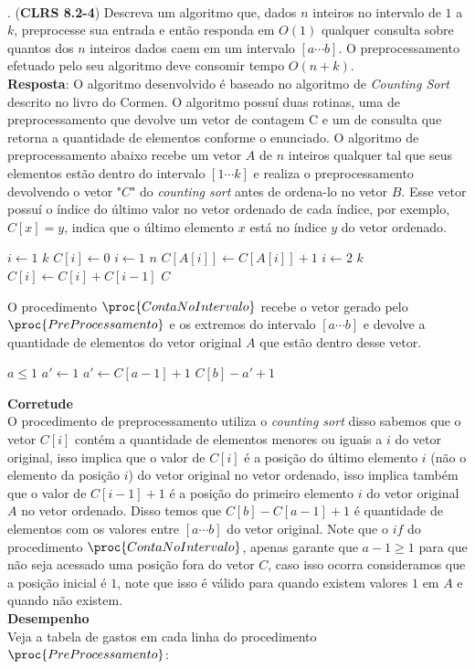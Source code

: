 \\[12pt]
. (\textbf{CLRS 8.2-4}) Descreva um algoritmo que, dados $n$ inteiros 
no intervalo de $1$ a $k$, preprocesse sua entrada e então responda em $O(1)$ 
qualquer consulta sobre quantos dos $n$ inteiros dados caem em um intervalo $[a 
\cdots b]$. O preprocessamento efetuado pelo seu algoritmo deve consomir tempo 
$O(n + k)$.
\\[6pt]
\textbf{Resposta}: O algoritmo desenvolvido é baseado no algoritmo de 
\textit{Counting Sort} descrito no livro do Cormen. O algoritmo possuí duas 
rotinas, uma de preprocessamento que devolve um vetor de contagem C e um de 
consulta que retorna a quantidade de elementos conforme o enunciado. O algoritmo 
de preprocessamento abaixo recebe um vetor $A$ de $n$ inteiros qualquer tal que 
seus elementos estão dentro do intervalo $[1 \cdots k]$ e  realiza o 
preprocessamento devolvendo o vetor "$C$" do \textit{counting sort} antes de 
ordena-lo no vetor $B$. Esse vetor possuí o índice do último valor no vetor 
ordenado de cada índice, por exemplo, $C[x] = y$, indica que o último elemento 
$x$ está no índice $y$ do vetor ordenado.

\begin{codebox}
\li    \For $i \gets 1$ \To $k$
\li    \Do
            $C[i] \gets 0$
       \End
\li    \For $i \gets 1$ \To $n$
\li    \Do
            $C[A[i]] \gets C[A[i]] + 1$
       \End
\li    \For $i \gets 2$ \To $k$
\li    \Do
            $C[i] \gets C[i] + C[i-1]$
       \End
\li    \Return $C$
\End
\end{codebox}
O procedimento $\proc{ContaNoIntervalo}$ recebe o vetor gerado pelo 
$\proc{PreProcessamento}$ e os extremos do intervalo $[a \cdots b]$ e devolve a 
quantidade de elementos do vetor original $A$ que estão dentro desse vetor.
\begin{codebox}
    \li \If $a \leq 1$
    \li     \Then
            $a' \gets 1$
    \li \Else
            $a' \gets C[a-1] + 1$
        \End
    \li \Return $C[b] - a' + 1$
\End
\end{codebox}
\textbf{Corretude}
\\[6pt]
O procedimento de preprocessamento utiliza o \textit{counting sort} disso 
sabemos que o vetor $C[i]$ contém a quantidade de elementos menores ou iguais a 
$i$ do vetor original, isso implica que o valor de $C[i]$ é a posição do último 
elemento $i$ (não o elemento da posição $i$) do vetor original no vetor 
ordenado, isso implica também que o valor de $C[i-1] + 1$ é a posição do 
primeiro elemento $i$ do vetor original $A$ no vetor ordenado. Disso temos que 
$C[b] - C[a-1] + 1$ é quantidade de elementos com os valores entre $[a \cdots 
b]$ do vetor original. Note que o $if$ do procedimento 
$\proc{ContaNoIntervalo}$, apenas garante que $a-1 \geq 1$ para que não seja 
acessado uma posição fora do vetor $C$, caso isso ocorra consideramos que a 
posição inicial é $1$, note que isso é válido para quando existem valores $1$ em 
$A$ e quando não existem.
\\[6pt]
\textbf{Desempenho}
\\[6pt]
Veja a tabela de gastos em cada linha do procedimento $\proc{PreProcessamento}$:

